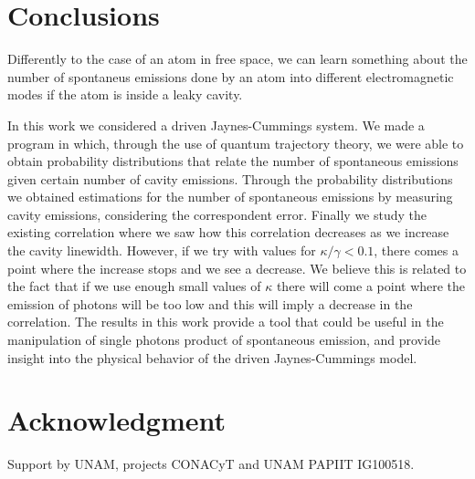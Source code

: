 \documentclass[conference]{IEEEtran}
\begin{document}


\section{Conclusions}\label{sc:conclusions}
Differently to the case of an atom in free space, we can learn
something about the number of spontaneus emissions done by an atom
into different electromagnetic modes if the atom is inside a leaky
cavity. 


In this work we considered a driven Jaynes-Cummings system. We made a
program in which, through the use of quantum trajectory theory, we
were able to obtain probability distributions that relate the number
of spontaneous emissions given certain number of cavity emissions.
Through the probability distributions we obtained estimations for the
number of spontaneous emissions by measuring cavity emissions,
considering the correspondent error. Finally we study the existing
correlation where we saw how this correlation decreases as we increase
the cavity linewidth. However, if we try with values for
$\kappa/\gamma < 0.1$, there comes a point where the increase stops
and we see a decrease. We believe this is related to the fact that if
we use enough small values of $\kappa$ there will come a point where
the emission of photons will be too low and this will imply a decrease
in the correlation. The results in this work provide a tool that could
be useful in the manipulation of single photons product of spontaneous
emission, and provide insight into the physical behavior of the driven
Jaynes-Cummings model.


\section*{Acknowledgment}

Support by UNAM, projects CONACyT and UNAM PAPIIT IG100518.




\end{document}
